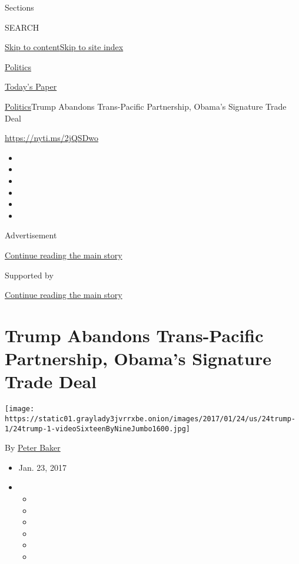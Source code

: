 Sections

SEARCH

\protect\hyperlink{site-content}{Skip to
content}\protect\hyperlink{site-index}{Skip to site index}

\href{https://www.nytimes3xbfgragh.onion/section/politics}{Politics}

\href{https://myaccount.nytimes3xbfgragh.onion/auth/login?response_type=cookie\&client_id=vi}{}

\href{https://www.nytimes3xbfgragh.onion/section/todayspaper}{Today's
Paper}

\href{/section/politics}{Politics}\textbar{}Trump Abandons Trans-Pacific
Partnership, Obama's Signature Trade Deal

\url{https://nyti.ms/2jQSDwo}

\begin{itemize}
\item
\item
\item
\item
\item
\item
\end{itemize}

Advertisement

\protect\hyperlink{after-top}{Continue reading the main story}

Supported by

\protect\hyperlink{after-sponsor}{Continue reading the main story}

\hypertarget{trump-abandons-trans-pacific-partnership-obamas-signature-trade-deal}{%
\section{Trump Abandons Trans-Pacific Partnership, Obama's Signature
Trade
Deal}\label{trump-abandons-trans-pacific-partnership-obamas-signature-trade-deal}}

\texttt{[image: https://static01.graylady3jvrrxbe.onion/images/2017/01/24/us/24trump-1/24trump-1-videoSixteenByNineJumbo1600.jpg]}

By \href{http://www.nytimes3xbfgragh.onion/by/peter-baker}{Peter Baker}

\begin{itemize}
\item
  Jan. 23, 2017
\item
  \begin{itemize}
  \item
  \item
  \item
  \item
  \item
  \item
  \end{itemize}
\end{itemize}

